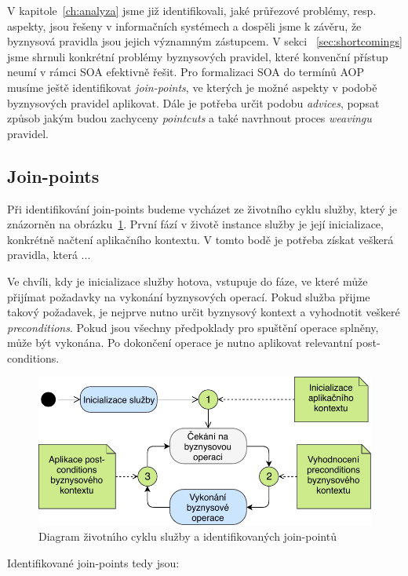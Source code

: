 V kapitole~\ref{ch:analyza} jsme již identifikovali, jaké průřezové problémy, resp. aspekty,
jsou řešeny v informačních systémech a dospěli jsme k závěru, že byznysová pravidla jsou
jejich významným zástupcem. V sekci ~\ref{sec:shortcomings} jsme shrnuli konkrétní
problémy byznysových pravidel, které konvenční přístup neumí v rámci \gls{SOA} efektivně řešit.
Pro formalizaci \gls{SOA} do termínů \gls{AOP} musíme ještě identifikovat \textit{join-points},
ve kterých je možné aspekty v podobě byznysových pravidel aplikovat. Dále je potřeba určit podobu
\textit{advices}, popsat způsob jakým budou zachyceny \textit{pointcuts} a také navrhnout proces
\textit{weavingu} pravidel.

\subsection{Join-points}

Při identifikování join-points budeme vycházet ze životního cyklu služby, který je znázorněn
na obrázku~\ref{fig:join-points}. První fází v životě instance služby je její inicializace,
konkrétně načtení aplikačního kontextu. V tomto bodě je potřeba získat veškerá pravidla, která ... %

Ve chvíli, kdy je inicializace služby hotova, vstupuje do fáze, ve které může přijímat požadavky
na vykonání byznysových operací. Pokud služba přijme takový požadavek, je nejprve nutno určit
byznysový kontext a vyhodnotit veškeré \textit{preconditions}. Pokud jsou všechny předpoklady
pro spuštění operace splněny, může být vykonána. Po dokončení operace je nutno aplikovat relevantní
post-conditions.

\begin{figure}
    \centering
    \includegraphics[keepaspectratio=true, width=0.8\linewidth]{figures/join-points.pdf}
    \caption{Diagram životn\'{\i}ho cyklu služby a identifikovan\'ych join-pointů}
    \label{fig:join-points}
\end{figure}

Identifikované join-points tedy jsou:

